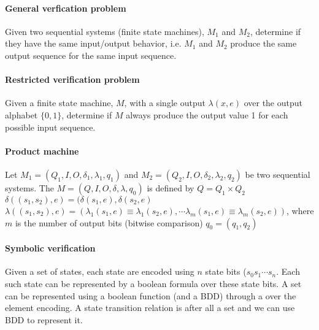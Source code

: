 \documentclass{memo}
\begin{document}
\small
{}

\paragraph{General verfication problem} 
Given two sequential systems (finite state machines), $M_1$ and $M_2$,
determine if they have the same input/output behavior, i.e. $M_1$ and $M_2$
produce the same output sequence for the same input sequence.

\paragraph{Restricted verification problem}
Given a finite state machine, $M$, with a single output $\lambda(x, e)$ over
the output alphabet $\{0, 1\}$, determine if $M$ always produce the output
value 1 for each possible input sequence.

\paragraph{Product machine}
Let $M_1 = (Q_1, I, O, \delta_1, \lambda_1, q_1)$ and
$M_2 = (Q_2, I, O, \delta_2, \lambda_2, q_2)$ be two sequential systems. 
The  $M = (Q, I, O, \delta, \lambda, q_0)$ is defined by
  \bit
  \w $Q = Q_1 \times Q_2$
  \w $\delta((s_1, s_2), e) = (\delta(s_1, e), \delta(s_2, e)$
  \w $\lambda((s_1, s_2), e) = (\lambda_1(s_1, e) \equiv \lambda_1(s_2, e), 
            \cdots \lambda_m(s_1, e) \equiv \lambda_m(s_2, e))$, where $m$ is
            the number of output bits (bitwise comparison)
  \w $q_0 = (q_1, q_2)$
  \eit


\paragraph{Symbolic verification}
\bit
\w Given a set of states, each state are encoded using $n$ state bits
($s_0s_1\cdots{}s_n$. Each such state can be represented by a boolean formula
over these state bits. 
\w A set can be represented using a boolean function (and a BDD) through a
 over the element encoding.
\w A state transition relation is after all a set and we can use BDD to
represent it.
\eit

\end{document}

